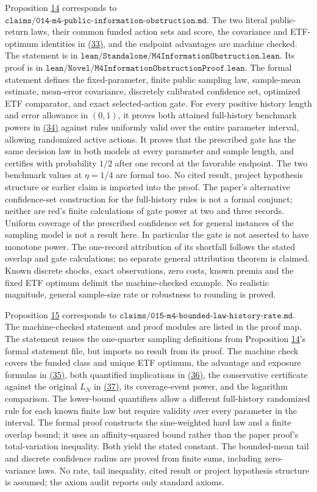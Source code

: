 \documentclass[11pt]{article}
\begin{document}
Proposition \hyperref[res:Proposition-14]{14} corresponds to
\(\texttt{claims/014-m4-public-information-obstruction.md}\).
The two literal public-return laws, their common funded action
sets and score, the covariance and ETF-optimum identities in
\hyperref[eq:33]{(33)}, and the endpoint advantages are machine checked. The
statement is in
\(\texttt{lean/Standalone/M4InformationObstruction.lean}\).
Its proof is in
\(\texttt{lean/Novel/M4InformationObstructionProof.lean}\).
The formal statement defines the fixed-parameter, finite public
sampling law, sample-mean estimate, mean-error covariance,
discretely calibrated confidence set, optimized ETF comparator,
and exact selected-action gate. For every positive history
length and error allowance in \((0,1)\), it proves both attained
full-history benchmark powers in \hyperref[eq:34]{(34)} against rules uniformly
valid over the entire parameter interval, allowing randomized
active actions. It proves that the prescribed gate has the same
decision law in both models at every parameter and sample
length, and certifies with probability \(1/2\) after one record
at the favorable endpoint. The two benchmark values at
\(\eta=1/4\) are formal too. No cited result, project hypothesis
structure or earlier claim is imported into the proof.
The paper's alternative confidence-set construction for the
full-history rules is not a formal conjunct; neither are red's
finite calculations of gate power at two and three records.
Uniform coverage of the prescribed confidence set for general
instances of the sampling model is not a result here.
In particular the gate is not asserted to have monotone power.
The one-record attribution of its shortfall follows the stated
overlap and gate calculations; no separate general attribution
theorem is claimed. Known discrete shocks, exact observations,
zero costs, known premia and the fixed ETF optimum delimit the
machine-checked example. No realistic magnitude, general
sample-size rate or robustness to rounding is proved.

Proposition \hyperref[res:Proposition-15]{15} corresponds to
\(\texttt{claims/015-m4-bounded-law-history-rate.md}\).
The machine-checked statement and proof modules are listed in
the proof map.
The statement reuses the one-quarter sampling definitions from
Proposition \hyperref[res:Proposition-14]{14}'s formal statement file, but imports no result
from its proof. The machine check covers the funded class and
unique ETF optimum, the advantage and exposure formulas in
\hyperref[eq:35]{(35)}, both quantified implications in \hyperref[eq:36]{(36)}, the conservative
certificate against the original \(L_N\) in \hyperref[eq:37]{(37)}, its
coverage-event power, and the logarithm comparison. The
lower-bound quantifiers allow a different full-history
randomized rule for each known finite law but require validity
over every parameter in the interval. The formal proof
constructs the sine-weighted hard law and a finite overlap
bound; it uses an affinity-squared bound rather than the
paper proof's total-variation inequality. Both yield the
stated constant. The bounded-mean tail and discrete confidence
radius are proved from finite sums, including zero-variance
laws. No rate, tail inequality, cited result or project
hypothesis structure is assumed; the axiom audit reports only
standard axioms.
\end{document}
